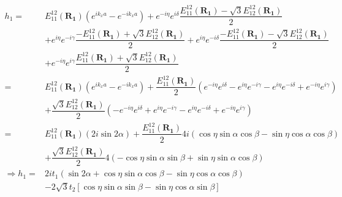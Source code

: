 \documentclass{article}
\begin{document}
\begin{align*}
    h_1  =           & E_{11}^{12}(\mathbf{R_1})\left( e^{ik_x a} - e^{-ik_x a} \right) + e^{-i\eta} e^{i\delta} \dfrac{E_{11}^{12}(\mathbf{R_1}) - \sqrt{3}E_{12}^{12}(\mathbf{R_1})}{2}                                                      \\
                     & + e^{i\eta} e^{-i\gamma} \dfrac{ -E_{11}^{12}(\mathbf{R_1}) + \sqrt{3} E_{12}^{12}(\mathbf{R_1})}{2} + e^{i\eta} e^{-i\delta} \dfrac{ -E_{11}^{12}(\mathbf{R_1}) - \sqrt{3} E_{12}^{12}(\mathbf{R_1})}{2}               \\
                     & + e^{-i\eta} e^{i\gamma} \dfrac{ E_{11}^{12}(\mathbf{R_1}) + \sqrt{3} E_{12}^{12}(\mathbf{R_1})}{2}                                                                                                                     \\
    =                & E_{11}^{12}(\mathbf{R_1})\left( e^{ik_x a} - e^{-ik_x a} \right) + \dfrac{E_{11}^{12}(\mathbf{R_1})}{2}\left( e^{-i\eta} e^{i\delta} - e^{i\eta} e^{-i\gamma} - e^{i\eta} e^{-i\delta} + e^{-i\eta} e^{i\gamma} \right) \\
                     & + \dfrac{\sqrt{3}E_{12}^{12}(\mathbf{R_1})}{2}\left( -e^{-i\eta} e^{i\delta} + e^{i\eta} e^{-i\gamma} - e^{i\eta} e^{-i\delta} + e^{-i\eta} e^{i\gamma} \right)                                                         \\
    =                & E_{11}^{12}(\mathbf{R_1})\left( 2i\sin2\alpha \right) + \dfrac{E_{11}^{12}(\mathbf{R_1})}{2}4i(\cos\eta\sin\alpha\cos\beta - \sin\eta\cos\alpha\cos\beta)                                                               \\
                     & +\dfrac{\sqrt{3}E_{12}^{12}(\mathbf{R_1})}{2}4(-\cos\eta\sin\alpha\sin\beta + \sin\eta\sin\alpha\cos\beta)                                                                                                              \\
    \Rightarrow h_1= & 2 i t_1 (\sin 2\alpha + \cos\eta\sin\alpha\cos\beta -    \sin\eta\cos\alpha\cos\beta )                                                                                                                                  \\
                     & - 2\sqrt{3}t_2\left[ \cos\eta\sin\alpha\sin\beta - \sin\eta\cos\alpha\sin\beta  \right]
\end{align*}
\end{document}
